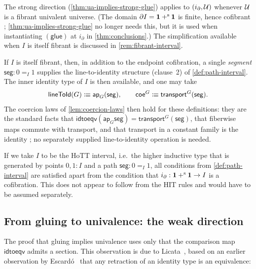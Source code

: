 \noindent
The strong direction (\cref{thm:ua-implies-strong-glue}) applies to
$(i_\partial,\mathcal{U})$ whenever $\mathcal{U}$ is a fibrant univalent universe. (The domain
$\partial I = \mathbf{1}+^{\mathrm{s}}\mathbf{1}$ is finite, hence cofibrant \citep[Lem.~3.25]{2LTT};
\cref{thm:ua-implies-strong-glue} no longer needs this, but it is used when
instantiating $(\mathsf{glue})$ at $i_\partial$ in
\cref{thm:conclusions}.) The simplification available when $I$ is
itself fibrant is discussed in \cref{rem:fibrant-interval}.


\begin{remark}\label{rem:fibrant-interval}
	If $I$ is itself fibrant, then, in addition to the endpoint cofibration, a single \emph{segment} $\mathsf{seg}:0=_I 1$ supplies the line-to-identity structure (clause~2) of \cref{def:path-interval}. The inner identity type of $I$ is then available, and one may take
	\[
		\mathsf{lineToId}(G)\mathrel{\vcentcolon\mspace{-1mu}\equiv}\mathsf{ap}_G(\mathsf{seg}),
		\qquad
		\mathsf{coe}^G\mathrel{\vcentcolon\mspace{-1mu}\equiv}\mathsf{transport}^G(\mathsf{seg}).
	\]
	The coercion laws of \cref{lem:coercion-laws} then hold for these definitions: they are the standard facts that $\mathsf{idtoeqv}(\mathsf{ap}_G \mathsf{seg})=\mathsf{transport}^G(\mathsf{seg})$, that fiberwise maps commute with transport, and that transport in a constant family is the identity \citep[\S2.3, \S2.10]{HoTTBook}; no separately supplied line-to-identity operation is needed.

	If we take \(I\) to be the HoTT interval, i.e.\ the higher inductive type that is generated by points
	\(0,1:I\) and a path \(\mathsf{seg}:0=_I1\), all conditions from \cref{def:path-interval} are satisfied apart from the condition that \(i_\partial:\mathbf{1}+^{\mathrm{s}}\mathbf{1}\rightarrow I\) is a cofibration.
	This does not appear to follow from the HIT rules and would have to be assumed separately.
\end{remark}

\subsection{From gluing to univalence: the weak direction}

The proof that gluing implies univalence uses only that the comparison map
$\mathsf{idtoeqv}$ admits a section.
This observation is due to Licata~\citep{Licata2016}, based on an earlier observation by Escard\'o~\citep{Escardo2014} that any retraction of an identity type is an equivalence:

